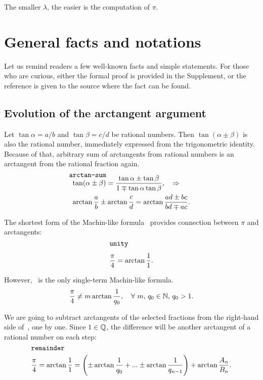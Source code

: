 \documentclass[draft, 11pt]{article} %
\newcounter{factno}
\def\thefactpun#1#2{\refstepcounter{factno}{\bf Fact~\thefactno\label{#1}#2\/}}
\begin{document}
The smaller $\lambda$, the easier is the computation
of $\pi$.~\cite{abrar, source-pi, lehmer-cite}

\section{General facts and notations}

Let us remind readers a few well-known facts and simple statements. For those who are
curious, either the formal proof is provided in the Supplement, or the reference is given
to the source where the fact can be found.

\subsection{Evolution of the arctangent argument}

Let $\tan\alpha =a/b$ and $\tan\beta = c/d$ be rational numbers.
Then $\tan(\alpha \pm \beta)$ is also the rational number,
immediately expressed from the trigonometric identity.
Because of that, arbitrary sum of arctangents from rational numbers is an arctangent from
the rational fraction again.~\cite{handbook}
%
\begin{equation}\mlabel{arctan-sum}
\begin{array}{l}
\tan(\alpha \pm \beta) = \dfrac{\tan\alpha \pm \tan\beta}{1 \mp \tan\alpha \tan\beta \strut},
    \quad\ergo \\
\arctan\dfrac{a}{b} \pm \arctan\dfrac{c \strut}{d} = \arctan\dfrac{ad \pm bc}{bd \mp ac}.
\end{array}
\end{equation}

The shortest form of the Machin-like formula~ provides connection between
$\pi$ and arctangents:
%
\begin{equation}\mlabel{unity}
\frac{\pi}{4} = \arctan\frac{1}{1}.
\end{equation}

However,~ is the only single-term Machin-like formula.
\thefactpun{nosingle}:
$$
\frac{\pi}{4} \ne m \arctan \displaystyle\frac{1}{q_0}, \quad \hbox{$\forall$ $m$, $q_0 \in \mathbb{N}$, $q_0>1$.}
$$

We are going to subtract arctangents of the selected fractions from the right-hand
side of~, one by one.
Since $1 \in \mathbb{Q}$, the difference will be another arctangent of a rational number
on each step:
%
\begin{equation}\mlabel{remainder}
\dfrac{\pi}{4} = \arctan\dfrac{1}{1} =
    \left( \pm \arctan\dfrac{1}{q_0 \strut} + ... \pm \arctan\dfrac{1}{q_{n-1}} \right)
    + \arctan\dfrac{A_n}{B_n}.
\end{equation}
\end{document}
